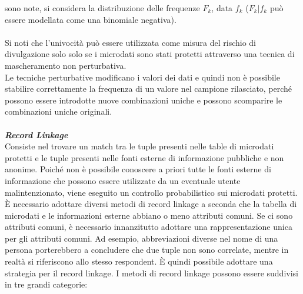 sono note, si considera la distribuzione delle frequenze $F_k$, data $f_k$ ($F_k|f_k$ può essere modellata come una binomiale negativa).
\\
\\Si noti che l'univocità può essere utilizzata come misura del rischio di divulgazione solo solo se i microdati sono stati protetti attraverso una 
tecnica di mascheramento non perturbativa.\\
Le tecniche perturbative modificano i valori dei dati e quindi non è possibile stabilire correttamente la frequenza di un valore nel campione rilasciato, perché possono essere introdotte nuove combinazioni uniche e possono scomparire le combinazioni uniche originali.
\\
\\\textit{\textbf{Record Linkage}}
\\
Consiste nel trovare un match tra le tuple presenti nelle table di microdati protetti e le tuple presenti nelle fonti esterne di informazione pubbliche e non anonime. Poiché non è possibile conoscere a priori tutte le fonti esterne di informazione che possono essere utilizzate da un eventuale utente malintenzionato, viene eseguito un controllo probabilistico sui microdati protetti.\\
È necessario adottare diversi metodi di record linkage a seconda che la tabella di microdati e le informazioni esterne abbiano o meno attributi comuni. Se ci sono attributi comuni, è necessario innanzitutto adottare una rappresentazione unica per gli attributi comuni. Ad esempio, abbreviazioni diverse nel nome di una persona porterebbero a concludere che due tuple non sono correlate, mentre in realtà si riferiscono allo stesso respondent. È quindi possibile adottare una strategia per il record linkage. I metodi di record linkage possono essere suddivisi in tre grandi categorie:
